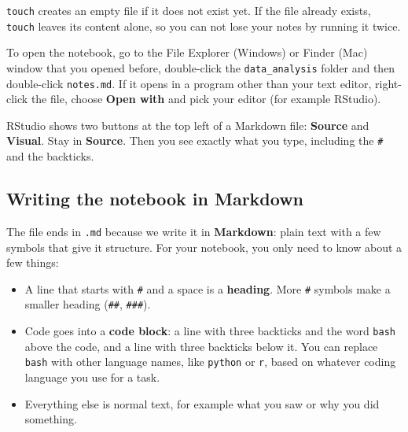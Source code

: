 \documentclass[
  letterpaper,
  DIV=11,
  numbers=noendperiod]{scrreprt}
\providecommand{\tightlist}{%
  \setlength{\itemsep}{0pt}\setlength{\parskip}{0pt}}
\begin{document}
\texttt{touch} creates an empty file if it does not exist yet. If the
file already exists, \texttt{touch} leaves its content alone, so you can
not lose your notes by running it twice.

To open the notebook, go to the File Explorer (Windows) or Finder (Mac)
window that you opened before, double-click the \texttt{data\_analysis}
folder and then double-click \texttt{notes.md}. If it opens in a program
other than your text editor, right-click the file, choose \textbf{Open
with} and pick your editor (for example RStudio).

\begin{tcolorbox}[enhanced jigsaw, coltitle=black, breakable, titlerule=0mm, colback=white, rightrule=.15mm, bottomrule=.15mm, toprule=.15mm, colframe=quarto-callout-tip-color-frame, colbacktitle=quarto-callout-tip-color!10!white, bottomtitle=1mm, opacitybacktitle=0.6, toptitle=1mm, leftrule=.75mm, arc=.35mm, title=\textcolor{quarto-callout-tip-color}{\faLightbulb}\hspace{0.5em}{Tip: RStudio users, stay in Source mode}, left=2mm, opacityback=0]

RStudio shows two buttons at the top left of a Markdown file:
\textbf{Source} and \textbf{Visual}. Stay in \textbf{Source}. Then you
see exactly what you type, including the \texttt{\#} and the backticks.

\end{tcolorbox}

\subsection{Writing the notebook in
Markdown}\label{writing-the-notebook-in-markdown}

The file ends in \texttt{.md} because we write it in \textbf{Markdown}:
plain text with a few symbols that give it structure. For your notebook,
you only need to know about a few things:

\begin{itemize}
\tightlist
\item
  A line that starts with \texttt{\#} and a space is a \textbf{heading}.
  More \texttt{\#} symbols make a smaller heading (\texttt{\#\#},
  \texttt{\#\#\#}).
\item
  Code goes into a \textbf{code block}: a line with three backticks and
  the word \texttt{bash} above the code, and a line with three backticks
  below it. You can replace \texttt{bash} with other language names,
  like \texttt{python} or \texttt{r}, based on whatever coding language
  you use for a task.
\item
  Everything else is normal text, for example what you saw or why you
  did something.
\end{itemize}
\end{document}
